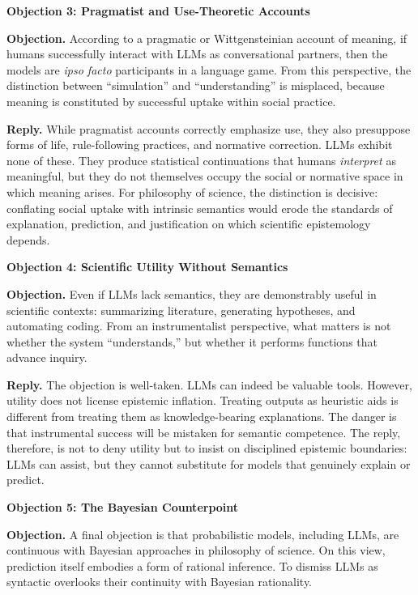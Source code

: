 \documentclass[12pt]{article}
\theoremstyle{plain}
\theoremstyle{definition}
\theoremstyle{remark}
\begin{document}
\noindent\textbf{Objection 3: Pragmatist and Use-Theoretic Accounts}

\textbf{Objection.} According to a pragmatic or Wittgensteinian account of meaning, 
if humans successfully interact with LLMs as conversational partners, then the models 
are \emph{ipso facto} participants in a language game. From this perspective, the 
distinction between ``simulation'' and ``understanding'' is misplaced, because 
meaning is constituted by successful uptake within social practice.

\textbf{Reply.} While pragmatist accounts correctly emphasize use, they also 
presuppose forms of life, rule-following practices, and normative correction. 
LLMs exhibit none of these. They produce statistical continuations that humans 
\emph{interpret} as meaningful, but they do not themselves occupy the social or 
normative space in which meaning arises. For philosophy of science, the distinction 
is decisive: conflating social uptake with intrinsic semantics would erode 
the standards of explanation, prediction, and justification on which scientific 
epistemology depends.

\noindent\textbf{Objection 4: Scientific Utility Without Semantics}

\textbf{Objection.} Even if LLMs lack semantics, they are demonstrably useful 
in scientific contexts: summarizing literature, generating hypotheses, and 
automating coding. From an instrumentalist perspective, what matters is not 
whether the system ``understands,'' but whether it performs functions that 
advance inquiry.

\textbf{Reply.} The objection is well-taken. LLMs can indeed be valuable tools. 
However, utility does not license epistemic inflation. Treating outputs as 
heuristic aids is different from treating them as knowledge-bearing explanations. 
The danger is that instrumental success will be mistaken for semantic competence. 
The reply, therefore, is not to deny utility but to insist on disciplined 
epistemic boundaries: LLMs can assist, but they cannot substitute for 
models that genuinely explain or predict.

\noindent\textbf{Objection 5: The Bayesian Counterpoint}

\textbf{Objection.} A final objection is that probabilistic models, including LLMs, 
are continuous with Bayesian approaches in philosophy of science. On this view, 
prediction itself embodies a form of rational inference. To dismiss LLMs as 
syntactic overlooks their continuity with Bayesian rationality.
\end{document}
